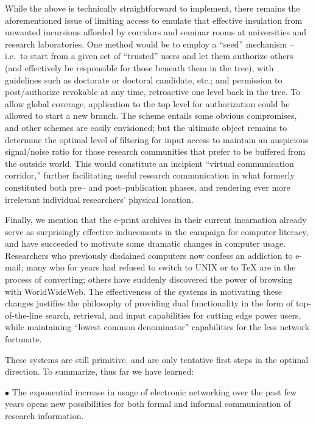 While the above is technically straightforward to implement, there remains the
aforementioned issue of limiting access to emulate that effective insulation
from unwanted incursions afforded by corridors and seminar rooms at
universities and research laboratories. One method would be to employ a
``seed'' mechanism -- i.e.\ to start from a given set of ``trusted'' users and
let them authorize others (and effectively be responsible for those beneath
them in the tree), with guidelines such as doctorate or doctoral candidate,
etc.; and permission to post/authorize revokable at any time, retroactive one
level back in the tree. To allow global coverage, application to the top level
for authorization could be allowed to start a new branch. The scheme entails
some obvious compromises, and other schemes are easily envisioned; but
the ultimate object remains to determine the optimal level of filtering
for input access to maintain an auspicious signal/noise ratio for those
research communities that prefer to be buffered from the outside world. This
would constitute an incipient ``virtual communication corridor,'' further
facilitating useful research communication in what formerly constituted both
pre-- and post--publication phases, and rendering ever more irrelevant
individual researchers' physical location.

Finally, we mention that the e-print archives in their current incarnation
already serve as surprisingly effective inducements in the campaign for
computer literacy, and have succeeded to motivate some dramatic changes in
computer usage. Researchers who previously disdained computers now confess an
addiction to e-mail; many who for years had refused to switch to UNIX or to TeX
are in the process of converting; others have suddenly discovered the power of
browsing with WorldWideWeb. The effectiveness of the systems in motivating
these changes justifies the philosophy of providing dual functionality in the
form of top-of-the-line search, retrieval, and input capabilities for cutting
edge power users, while maintaining ``lowest common denominator'' capabilities
for the less network fortunate.


\medskip{}

These systems are still
primitive, and are only tentative first steps in the optimal direction.
To summarize, thus far we have learned:

\item{$\bullet$}
The exponential increase in usage of electronic networking over the past
few years opens new possibilities for both formal and informal communication
of research information.

